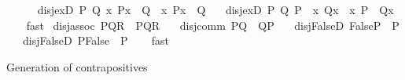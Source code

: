 \begin{isabellebody}
\ \ %
\isanewline
\ \ \ disj{\isacharunderscore}{\kern0pt}exD{}{\isacharcolon}{\kern0pt}\ {\isachardoublequoteopen}{\isasymAnd}P\ Q{\isachardot}{\kern0pt}\ {\isacharparenleft}{\kern0pt}{\isasymexists}x{\isachardot}{\kern0pt}\ P{\isacharparenleft}{\kern0pt}x{\isacharparenright}{\kern0pt}{\isacharparenright}{\kern0pt}\ {\isasymor}\ Q\ {\isasymLongrightarrow}\ {\isasymexists}x{\isachardot}{\kern0pt}\ P{\isacharparenleft}{\kern0pt}x{\isacharparenright}{\kern0pt}\ {\isasymor}\ Q{\isachardoublequoteclose}\isanewline
\ \ \ disj{\isacharunderscore}{\kern0pt}exD{}{\isacharcolon}{\kern0pt}\ {\isachardoublequoteopen}{\isasymAnd}P\ Q{\isachardot}{\kern0pt}\ P\ {\isasymor}\ {\isacharparenleft}{\kern0pt}{\isasymexists}x{\isachardot}{\kern0pt}\ Q{\isacharparenleft}{\kern0pt}x{\isacharparenright}{\kern0pt}{\isacharparenright}{\kern0pt}\ {\isasymLongrightarrow}\ {\isasymexists}x{\isachardot}{\kern0pt}\ P\ {\isasymor}\ Q{\isacharparenleft}{\kern0pt}x{\isacharparenright}{\kern0pt}{\isachardoublequoteclose}\isanewline
%
\isadelimproof
\ \ %
\endisadelimproof
%
\isatagproof
{}\isamarkupfalse%
\ fast{\isacharplus}{\kern0pt}%
\endisatagproof
{\isafoldproof}%
%
\isadelimproof
\isanewline
%
\endisadelimproof
\isanewline
{}\isamarkupfalse%
\ disj{\isacharunderscore}{\kern0pt}assoc{\isacharcolon}{\kern0pt}\ {\isachardoublequoteopen}{\isacharparenleft}{\kern0pt}P{\isasymor}Q{\isacharparenright}{\kern0pt}{\isasymor}R\ {\isasymLongrightarrow}\ P{\isasymor}{\isacharparenleft}{\kern0pt}Q{\isasymor}R{\isacharparenright}{\kern0pt}{\isachardoublequoteclose}\isanewline
\ \ \ disj{\isacharunderscore}{\kern0pt}comm{\isacharcolon}{\kern0pt}\ {\isachardoublequoteopen}P{\isasymor}Q\ {\isasymLongrightarrow}\ Q{\isasymor}P{\isachardoublequoteclose}\isanewline
\ \ \ disj{\isacharunderscore}{\kern0pt}FalseD{}{\isacharcolon}{\kern0pt}\ {\isachardoublequoteopen}False{\isasymor}P\ {\isasymLongrightarrow}\ P{\isachardoublequoteclose}\isanewline
\ \ \ disj{\isacharunderscore}{\kern0pt}FalseD{}{\isacharcolon}{\kern0pt}\ {\isachardoublequoteopen}P{\isasymor}False\ {\isasymLongrightarrow}\ P{\isachardoublequoteclose}\isanewline
%
\isadelimproof
\ \ %
\endisadelimproof
%
\isatagproof
{}\isamarkupfalse%
\ fast{\isacharplus}{\kern0pt}%
\endisatagproof
{\isafoldproof}%
%
\isadelimproof
%
\endisadelimproof
%
\begin{isamarkuptext}%
Generation of contrapositives%

\end{isamarkuptext}
\end{isabellebody}
